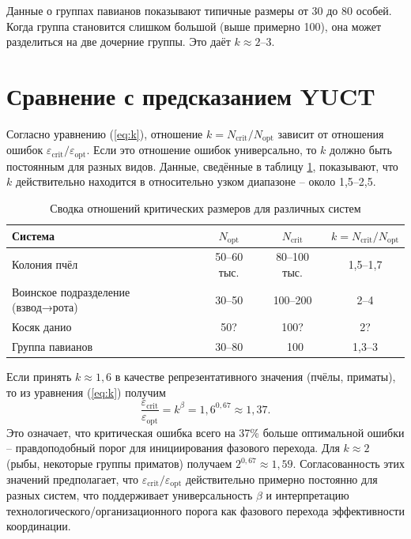\documentclass[12pt]{article}
\theoremstyle{remark}
\begin{document}
	Данные о группах павианов \cite{Alberts1995} показывают типичные размеры от 30 до 80 особей. Когда группа становится слишком большой (выше примерно 100), она может разделиться на две дочерние группы. Это даёт $k \approx 2$–$3$.
	
	\section{Сравнение с предсказанием YUCT}
	\label{sec:comparison}
	
	Согласно уравнению (\ref{eq:k}), отношение $k = N_{\text{crit}}/N_{\text{opt}}$ зависит от отношения ошибок $\varepsilon_{\text{crit}}/\varepsilon_{\text{opt}}$. Если это отношение ошибок универсально, то $k$ должно быть постоянным для разных видов. Данные, сведённые в таблицу \ref{tab:summary}, показывают, что $k$ действительно находится в относительно узком диапазоне – около 1,5–2,5.
	
	\begin{table}[htbp]
		\centering
		\caption{Сводка отношений критических размеров для различных систем}
		\label{tab:summary}
		\begin{tabular}{lccc}
			\toprule
			\textbf{Система} & $N_{\text{opt}}$ & $N_{\text{crit}}$ & $k = N_{\text{crit}}/N_{\text{opt}}$ \\
			\midrule
			Колония пчёл & 50–60 тыс. & 80–100 тыс. & 1,5–1,7 \\
			Воинское подразделение (взвод→рота) & 30–50 & 100–200 & 2–4 \\
			Косяк данио & 50? & 100? & 2? \\
			Группа павианов & 30–80 & ~100 & 1,3–3 \\
			\bottomrule
		\end{tabular}
	\end{table}
	
	Если принять $k \approx 1,6$ в качестве репрезентативного значения (пчёлы, приматы), то из уравнения (\ref{eq:k}) получим
	\[
	\frac{\varepsilon_{\text{crit}}}{\varepsilon_{\text{opt}}} = k^{\beta} = 1,6^{0,67} \approx 1,37.
	\]
	Это означает, что критическая ошибка всего на 37\% больше оптимальной ошибки – правдоподобный порог для инициирования фазового перехода. Для $k \approx 2$ (рыбы, некоторые группы приматов) получаем $2^{0,67} \approx 1,59$. Согласованность этих значений предполагает, что $\varepsilon_{\text{crit}}/\varepsilon_{\text{opt}}$ действительно примерно постоянно для разных систем, что поддерживает универсальность $\beta$ и интерпретацию технологического/организационного порога как фазового перехода эффективности координации.
	
\end{document}
